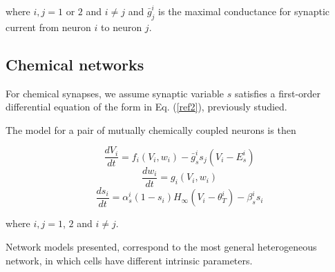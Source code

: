 where $i,j = 1 $ or $2$ and $i \neq j$ and $\bar{g}_{j}^{i}$ is the maximal conductance for synaptic current from neuron $i$ to neuron $j$.


\subsection{Chemical networks}
For chemical synapses, we assume synaptic variable $s$ satisfies a first-order differential equation of the form in Eq. (\ref{ref2}), previously studied.

The model for a pair of mutually chemically coupled neurons is then

\begin{equation}
    \frac{dV_{i}}{dt}  = f_{i}(V_{i},w_{i}) - \bar{g}_{s}^{i}s_{j}(V_{i}-E_{s}^{i})
\end{equation}
\begin{equation}
    \frac{dw_{i}}{dt}  = g_{i}(V_{i},w_{i})
\end{equation}
\begin{equation}
    \frac{ds_{i}}{dt}  = \alpha_{s}^{i}(1-s_{i})H_{\infty}(V_{i}-\theta_{T}^{i})-\beta_{s}^{i}s_{i}
\end{equation}

where $i,j = 1 $, $2$ and $i \neq j$.

Network models presented, correspond to the most general heterogeneous network, in which cells have different intrinsic parameters.
